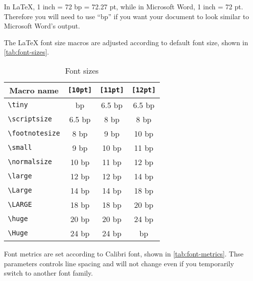 \documentclass[letterpaper]{wordfeel}
\begin{document}
In \LaTeX, 1 inch = 72 bp = 72.27 pt, while in Microsoft Word, 1 inch = 72 pt. Therefore you will need to use ``bp'' if you want your document to look similar to Microsoft Word's output.

\FloatBarrier

The \LaTeX{} font size macros are adjusted according to default font size, shown in \autoref{tab:font-sizes}.

\begin{table}[htb]
    \centering
    \caption{Font sizes}
    \label{tab:font-sizes}
    \begin{tabular}{lccc}
        \toprule
        \multicolumn{1}{c}{Macro name} & \texttt{[10pt]} & \texttt{[11pt]} & \texttt{[12pt]} \\
        \midrule
        \texttt{\textbackslash{}tiny} & \fontsize{5bp}{6.103515625bp}\selectfont 5 bp & \tiny 6.5 bp & \tiny 6.5 bp \\
        \texttt{\textbackslash{}scriptsize} & \tiny 6.5 bp & \scriptsize 8 bp & \scriptsize 8 bp \\
        \texttt{\textbackslash{}footnotesize} & \scriptsize 8 bp & \footnotesize 9 bp & \small 10 bp \\
        \texttt{\textbackslash{}small} & \footnotesize 9 bp & \small 10 bp & \normalsize 11 bp \\
        \texttt{\textbackslash{}normalsize} & \small 10 bp & \normalsize 11 bp & \large 12 bp \\
        \texttt{\textbackslash{}large} & \large 12 bp & \large 12 bp & \Large 14 bp \\
        \texttt{\textbackslash{}Large} & \Large 14 bp & \Large 14 bp & \LARGE 18 bp \\
        \texttt{\textbackslash{}LARGE} & \LARGE 18 bp & \LARGE 18 bp & \huge 20 bp \\
        \texttt{\textbackslash{}huge} & \huge 20 bp & \huge 20 bp & \Huge 24 bp \\
        \texttt{\textbackslash{}Huge} & \Huge 24 bp & \Huge 24 bp & \fontsize{26bp}{31.73828125bp}\selectfont 26 bp \\
        \bottomrule
    \end{tabular}
\end{table}

\FloatBarrier

Font metrics are set according to Calibri font, shown in \autoref{tab:font-metrics}. Thse parameters controls line spacing and will not change even if you temporarily switch to another font family.
\end{document}
